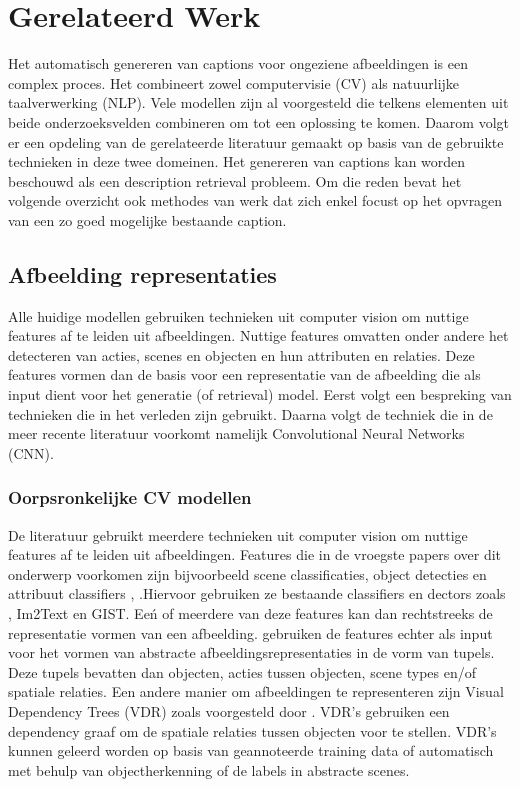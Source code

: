 \chapter{Gerelateerd Werk}
\label{hoofdstuk:related}
Het automatisch genereren van captions voor ongeziene afbeeldingen is een complex proces. Het combineert zowel computervisie (CV) als natuurlijke taalverwerking (NLP). Vele modellen zijn al voorgesteld die telkens elementen uit beide onderzoeksvelden combineren om tot een oplossing te komen. Daarom volgt er een opdeling van de gerelateerde literatuur gemaakt op basis van de gebruikte technieken in deze twee domeinen. Het genereren van captions kan worden beschouwd als een description retrieval probleem.\cite{Hodosh}  Om die reden bevat het volgende overzicht ook methodes van werk dat zich enkel focust op het opvragen van een zo goed mogelijke bestaande caption.

\section{Afbeelding representaties}
Alle huidige modellen gebruiken technieken uit computer vision om nuttige features af te leiden uit afbeeldingen. Nuttige features omvatten onder andere het detecteren van acties, scenes en objecten en hun attributen en relaties. \cite{bernardi} 
Deze features vormen dan de basis voor een representatie van de afbeelding die als input dient voor het generatie (of retrieval) model. Eerst volgt een bespreking van technieken die in het verleden zijn gebruikt. Daarna volgt de techniek die in de meer recente literatuur voorkomt namelijk Convolutional Neural Networks (CNN).

\subsection{Oorpsronkelijke CV modellen}
De literatuur gebruikt meerdere technieken uit computer vision om nuttige features af te leiden uit afbeeldingen. Features die in de vroegste papers over dit onderwerp voorkomen zijn bijvoorbeeld scene classificaties, object detecties en attribuut classifiers \cite{Farhadi},\cite{Yang}\cite{Patterson} .Hiervoor gebruiken ze bestaande classifiers en dectors zoals \cite{Felzenszwalb}, Im2Text \cite{Ordonez} en GIST\cite{Oliva}. Ee\'n of meerdere van deze features kan dan rechtstreeks de representatie vormen van een afbeelding. \cite{Farhadi} \cite{Yang} \cite{Li} \cite{Mitchell} gebruiken de features echter als input voor het vormen van abstracte afbeeldingsrepresentaties in de vorm van tupels. Deze tupels bevatten dan objecten, acties tussen objecten, scene types en/of spatiale relaties.
Een andere manier om afbeeldingen te representeren zijn Visual Dependency Trees (VDR) zoals voorgesteld door \cite{Eliott2013}. VDR's gebruiken een dependency graaf om de spatiale relaties tussen objecten voor te stellen. VDR's kunnen geleerd worden op basis van geannoteerde training data of automatisch met behulp van objectherkenning \cite{Eliott2015} of de labels in abstracte scenes. \cite{Ortiz} 

